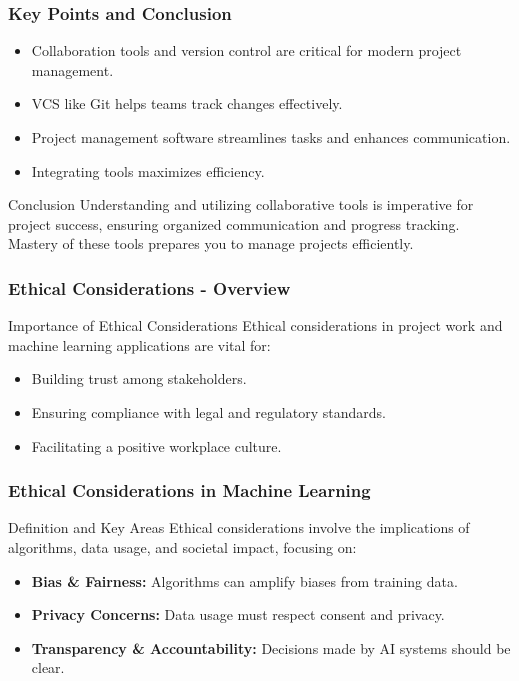 \documentclass[aspectratio=169]{beamer}
\begin{document}
\begin{frame}[fragile]
    \frametitle{Key Points and Conclusion}
    \begin{itemize}
        \item Collaboration tools and version control are critical for modern project management.
        \item VCS like Git helps teams track changes effectively.
        \item Project management software streamlines tasks and enhances communication.
        \item Integrating tools maximizes efficiency.
    \end{itemize}
    \begin{block}{Conclusion}
        Understanding and utilizing collaborative tools is imperative for project success, ensuring organized communication and progress tracking. Mastery of these tools prepares you to manage projects efficiently.
    \end{block}
\end{frame}

\begin{frame}[fragile]
    \frametitle{Ethical Considerations - Overview}
    \begin{block}{Importance of Ethical Considerations}
        Ethical considerations in project work and machine learning applications are vital for:
        \begin{itemize}
            \item Building trust among stakeholders.
            \item Ensuring compliance with legal and regulatory standards.
            \item Facilitating a positive workplace culture.
        \end{itemize}
    \end{block}
\end{frame}

\begin{frame}[fragile]
    \frametitle{Ethical Considerations in Machine Learning}
    \begin{block}{Definition and Key Areas}
        Ethical considerations involve the implications of algorithms, data usage, and societal impact, focusing on:
        \begin{itemize}
            \item \textbf{Bias \& Fairness:} Algorithms can amplify biases from training data.
            \item \textbf{Privacy Concerns:} Data usage must respect consent and privacy.
            \item \textbf{Transparency \& Accountability:} Decisions made by AI systems should be clear.
        \end{itemize}
    \end{block}
\end{frame}
\end{document}
